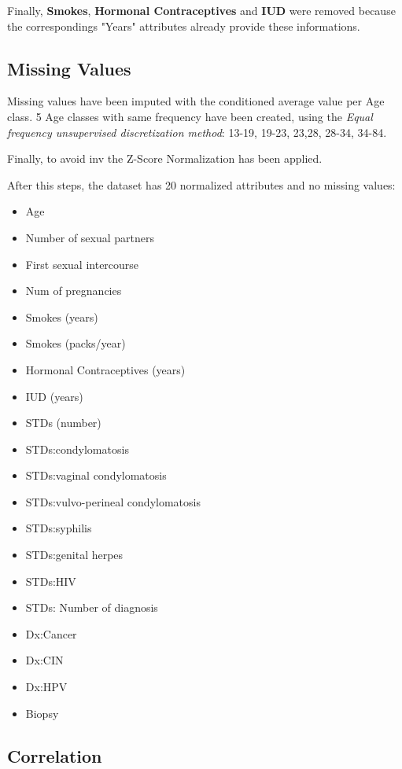Finally, \textbf{Smokes}, \textbf{Hormonal Contraceptives} and \textbf{IUD} were removed because the correspondings "Years" attributes already provide these informations.

\subsection{Missing Values}

Missing values have been imputed with the conditioned average value per Age class. 5 Age classes with same frequency have been created, using the \textit{Equal frequency unsupervised discretization method}: 13-19, 19-23, 23,28, 28-34, 34-84.

Finally, to avoid inv the Z-Score Normalization has been applied.

After this steps, the dataset has 20 normalized attributes and no missing values:

\begin{itemize}
    \item Age
    \item Number of sexual partners
    \item First sexual intercourse
    \item Num of pregnancies
    \item Smokes (years)
    \item Smokes (packs/year)
    \item Hormonal Contraceptives (years)
    \item IUD (years)
    \item STDs (number)
    \item STDs:condylomatosis
    \item STDs:vaginal condylomatosis
    \item STDs:vulvo-perineal condylomatosis
    \item STDs:syphilis
    \item STDs:genital herpes
    \item STDs:HIV
    \item STDs: Number of diagnosis
    \item Dx:Cancer
    \item Dx:CIN
    \item Dx:HPV
    \item Biopsy
\end{itemize}

\subsection{Correlation}

